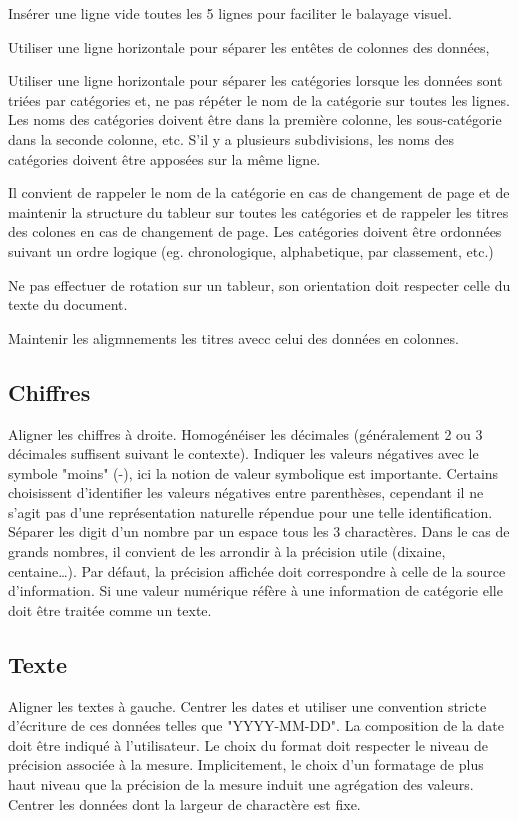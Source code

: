 \documentclass[a4paper,12pt]{article}
\begin{document}
\begin{multicols}{2}
Insérer une ligne vide toutes les 5 lignes pour faciliter le balayage visuel. \autocite{NFENISO9241-125ErgonomieLinteractionHommesysteme2017}

Utiliser une ligne horizontale pour séparer les entêtes de colonnes des données,

Utiliser une ligne horizontale pour séparer les catégories lorsque les données sont triées par catégories et, ne pas répéter le nom de la catégorie sur toutes les lignes. Les noms des catégories doivent être dans la première colonne, les sous-catégorie dans la seconde colonne, etc. S'il y a plusieurs subdivisions, les noms des catégories doivent être apposées sur la même ligne.

Il convient de rappeler le nom de la catégorie en cas de changement de page et de maintenir la structure du tableur sur toutes les catégories et de rappeler les titres des colones en cas de changement de page.
Les catégories doivent être ordonnées suivant un ordre logique (eg. chronologique, alphabetique, par classement, etc.)

Ne pas effectuer de rotation sur un tableur, son orientation doit respecter celle du texte du document.

Maintenir les aligmnements les titres avecc celui des données en colonnes.
\subsection*{Chiffres}
\label{sec:org48d626e}
Aligner les chiffres à droite.
Homogénéiser les décimales (généralement 2 ou 3 décimales suffisent suivant le contexte).
Indiquer les valeurs négatives avec le symbole "moins" (-), ici la notion de valeur symbolique est importante. Certains choisissent d'identifier les valeurs négatives entre parenthèses, cependant il ne s'agit pas d'une représentation naturelle répendue pour une telle identification.
Séparer les digit d'un nombre par un espace tous les 3 charactères. Dans le cas de grands nombres, il convient de les arrondir à la précision utile (dixaine, centaine\ldots{}). Par défaut, la précision affichée doit correspondre à celle de la source d'information.
Si une valeur numérique réfère à une information de catégorie elle doit être traitée comme un texte.
\subsection*{Texte}
\label{sec:org05f12c9}
Aligner les textes à gauche.
Centrer les dates et utiliser une convention stricte d'écriture de ces données telles que "YYYY-MM-DD". \autocite{ISO8601-1DateHeureRepresentations2019} La composition de la date doit être indiqué à l'utilisateur. Le choix du format doit respecter le niveau de précision associée à la mesure. Implicitement, le choix d'un formatage de plus haut niveau que la précision de la mesure induit une agrégation des valeurs.
Centrer les données dont la largeur de charactère est fixe.

\end{multicols}
\end{document}
